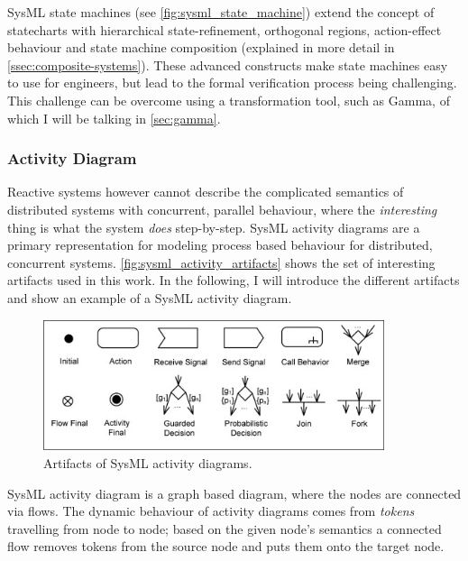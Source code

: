 SysML state machines (see \ref{fig:sysml_state_machine}) extend the concept of statecharts with hierarchical state-refinement, orthogonal regions, action-effect behaviour and state machine composition (explained in more detail in \autoref{ssec:composite-systems}). These advanced constructs make state machines easy to use for engineers, but lead to the formal verification process being challenging. This challenge can be overcome using a transformation tool, such as Gamma, of which I will be talking in \autoref{sec:gamma}.

\subsubsection{Activity Diagram}\label{ssec:sysml_activity}

Reactive systems however cannot describe the complicated semantics of distributed systems with concurrent, parallel behaviour, where the \emph{interesting} thing is what the system \emph{does} step-by-step. SysML activity diagrams are a primary representation for modeling process based behaviour\cite{omg_sysml} for distributed, concurrent systems. \autoref{fig:sysml_activity_artifacts} shows the set of interesting artifacts used in this work. In the following, I will introduce the different artifacts and show an example of a SysML activity diagram.

\begin{figure}[!ht]
	\centering
	\includegraphics[width=100mm, keepaspectratio]{figures/sysml_activity_artifacts.png}\hspace{1cm}
	\caption{Artifacts of SysML activity diagrams.}
	\label{fig:sysml_activity_artifacts}
\end{figure}

SysML activity diagram is a graph based diagram, where the nodes are connected via flows. The dynamic behaviour of activity diagrams comes from \emph{tokens} travelling from node to node; based on the given node's semantics a connected flow removes tokens from the source node and puts them onto the target node.

